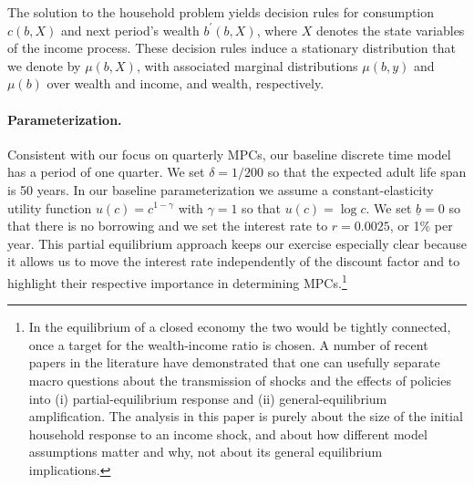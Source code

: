 The solution to the household problem yields decision rules for consumption  $c\left( b,X\right)$ and next period's wealth $b^{\prime }\left( b,X\right)$, where $X$ denotes the state variables of the income process. These decision rules induce a stationary distribution that we denote by $\mu \left( b,X\right) $, with associated marginal distributions $\mu \left( b,y\right) $ and $\mu \left( b\right) $ over wealth and income, and wealth, respectively.
%
%


\paragraph{Parameterization.} \label{sec:one_asset_param}
Consistent with our focus on quarterly MPCs, our baseline discrete time model has a period of one quarter. We set $\delta =1/200$ so that the expected adult life span is 50 years. In our baseline parameterization we assume a constant-elasticity utility function $u\left( c\right) =c^{1-\gamma }$ with  $\gamma =1$ so that $u\left( c\right) =\log c$. We set $\underline{b}=0$ so that there is no borrowing and we set the interest rate to $r=0.0025$, or 1\% per year. This partial equilibrium approach keeps our exercise especially clear because it allows us to move the interest rate independently of the discount factor and to highlight their respective importance in determining MPCs.\footnote{In the equilibrium of a closed economy the two would be tightly connected, once a target for the wealth-income ratio is chosen. A number of recent papers in the literature \citep{auclert2018intertemporal,kaplan2018monetary,wolf2019missing} have demonstrated that one can usefully separate macro questions about the transmission of shocks and the effects of policies into (i) partial-equilibrium response and (ii) general-equilibrium amplification. The analysis in this paper is purely about the size of the initial household response to an income shock, and about how different model assumptions matter and why, not about its general equilibrium implications.}

